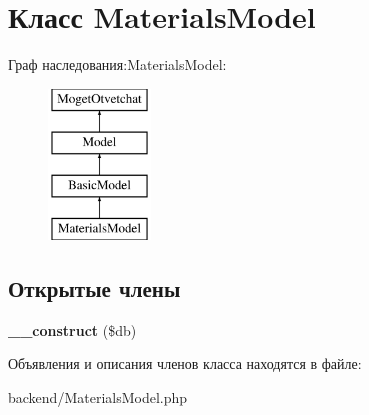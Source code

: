 \hypertarget{classMaterialsModel}{}\section{Класс Materials\+Model}
\label{classMaterialsModel}
Граф наследования\+:Materials\+Model\+:\begin{figure}[H]
\begin{center}
\leavevmode
\includegraphics[height=4.000000cm]{classMaterialsModel}
\end{center}
\end{figure}
\subsection*{Открытые члены}
\begin{DoxyCompactItemize}
\item 
\hypertarget{classMaterialsModel_aafd370a9667837fee7b852f37af3425d}{}{\bfseries \+\_\+\+\_\+construct} (\$db)\label{classMaterialsModel_aafd370a9667837fee7b852f37af3425d}

\end{DoxyCompactItemize}


Объявления и описания членов класса находятся в файле\+:\begin{DoxyCompactItemize}
\item 
backend/Materials\+Model.\+php\end{DoxyCompactItemize}
